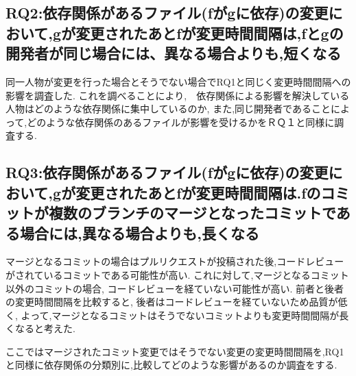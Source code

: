 \documentclass{fose2016}           %
\begin{document}
\subsection{RQ2:依存関係があるファイル(fがgに依存)の変更において,gが変更されたあとfが変更時間間隔は,fとgの開発者が同じ場合には、異なる場合よりも,短くなる}
同一人物が変更を行った場合とそうでない場合でRQ1と同じく変更時間間隔への影響を調査した.
これを調べることにより,　依存関係による影響を解決している人物はどのような依存関係に集中しているのか,
また,同じ開発者であることによって,どのような依存関係のあるファイルが影響を受けるかをＲＱ１と同様に調査する.

\subsection{RQ3:依存関係があるファイル(fがgに依存)の変更において,gが変更されたあとfが変更時間間隔は.fのコミットが複数のブランチのマージとなったコミットである場合には,異なる場合よりも,長くなる}
マージとなるコミットの場合はプルリクエストが投稿された後,コードレビューがされているコミットである可能性が高い.
これに対して,マージとなるコミット以外のコミットの場合, コードレビューを経ていない可能性が高い.
前者と後者の変更時間間隔を比較すると, 後者はコードレビューを経ていないため品質が低く,
よって,マージとなるコミットはそうでないコミットよりも変更時間間隔が長くなると考えた.

ここではマージされたコミット変更ではそうでない変更の変更時間間隔を,RQ1と同様に依存関係の分類別に,比較してどのような影響があるのか調査をする.

\end{document}
